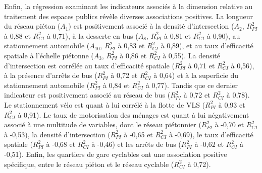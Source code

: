\begin{refsegment}
Enfin, la régression examinant les indicateurs associés à la dimension relative au traitement des espaces publics révèle diverses associations positives. La longueur du réseau piéton (\(A_{1}\)) est positivement associé à la densité d'intersection (\(A_{2}\), \(R^{2}_{PI}\) à 0,88 et \(R^{2}_{CI}\) à 0,71), à la desserte en bus (\(A_{8}\), \(R^{2}_{PI}\) à 0,81 et \(R^{2}_{CI}\) à 0,90), au stationnement automobile (\(A_{10}\), \(R^{2}_{PI}\) à 0,83 et \(R^{2}_{CI}\) à 0,89), et au taux d'efficacité spatiale à l'échelle piétonne (\(A_{3}\), \(R^{2}_{PI}\) à 0,86 et \(R^{2}_{CI}\) à 0,55). La densité d'intersection est corrélée au taux d'efficacité spatiale (\(R^{2}_{PI}\) à 0,71 et \(R^{2}_{CI}\) à 0,56), à la présence d'arrêts de bus (\(R^{2}_{PI}\) à 0,72 et \(R^{2}_{CI}\) à 0,64) et à la superficie du stationnement automobile (\(R^{2}_{PI}\) à 0,84 et \(R^{2}_{CI}\) à 0,77). Tandis que ce dernier indicateur est positivement associé au réseau de bus (\(R^{2}_{PI}\) à 0,72 et \(R^{2}_{CI}\) à 0,78). Le stationnement vélo est quant à lui corrélé à la flotte de \acrshort{VLS} (\(R^{2}_{PI}\) à 0,93 et \(R^{2}_{CI}\) à 0,91). Le taux de motorisation des ménages est quant à lui négativement associé à une multitude de variables, dont le réseau piétonnier (\(R^{2}_{PI}\) à -0,70 et \(R^{2}_{CI}\) à -0,53), la densité d'intersection (\(R^{2}_{PI}\) à -0,65 et \(R^{2}_{CI}\) à -0,69), le taux d'efficacité spatiale (\(R^{2}_{PI}\) à -0,68 et \(R^{2}_{CI}\) à -0,46) et les arrêts de bus (\(R^{2}_{PI}\) à -0,62 et \(R^{2}_{CI}\) à -0,51). Enfin, les quartiers de gare cyclables ont une association positive spécifique, entre le réseau piéton et le réseau cyclable (\(R^{2}_{CI}\) à 0,72).



\end{refsegment}
